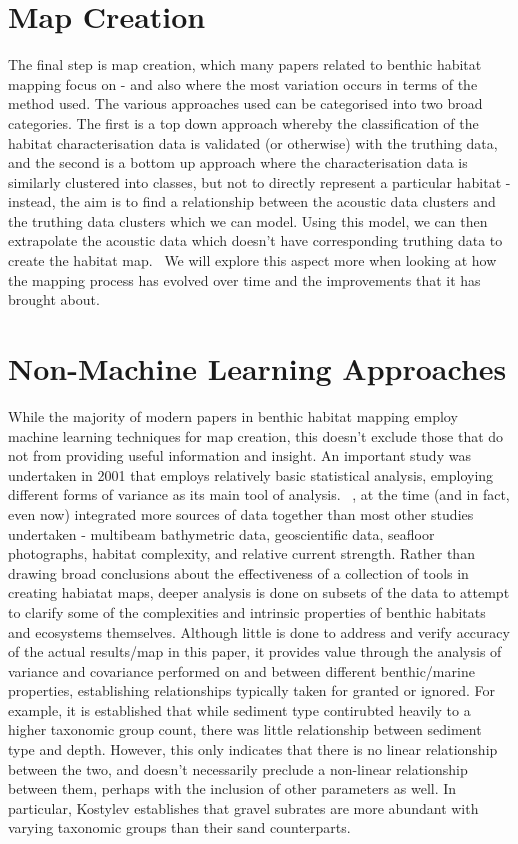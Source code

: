             \section{Map Creation}
            The final step is map creation, which many papers related to benthic habitat mapping focus on - and also where the most variation occurs in terms of the method used. The various approaches used can be categorised into two broad categories. The first is a top down approach whereby the classification of the habitat characterisation data is validated (or otherwise) with the truthing data, and the second is a bottom up approach where the characterisation data is similarly clustered into classes, but not to directly represent a particular habitat - instead, the aim is to find a relationship between the acoustic data clusters and the truthing data clusters which we can model. Using this model, we can then extrapolate the acoustic data which doesn't have corresponding truthing data to create the habitat map.~\citep{ahsan11} We will explore this aspect more when looking at how the mapping process has evolved over time and the improvements that it has brought about.

            \section{Non-Machine Learning Approaches} 
             While the majority of modern papers in benthic habitat mapping employ machine learning techniques for map creation, this doesn't exclude those that do not from providing useful information and insight. An important study was undertaken in 2001 that employs relatively basic statistical analysis, employing different forms of variance as its main tool of analysis. ~\citep{kostylev01}, at the time (and in fact, even now) integrated more sources of data together than most other studies undertaken - multibeam bathymetric data, geoscientific data, seafloor photographs, habitat complexity, and relative current strength. Rather than drawing broad conclusions about the effectiveness of a collection of tools in creating habiatat maps, deeper analysis is done on subsets of the data to attempt to clarify some of the complexities and intrinsic properties of benthic habitats and ecosystems themselves. Although little is done to address and verify accuracy of the actual results/map in this paper, it provides value through the analysis of variance and covariance performed on and between different benthic/marine properties, establishing relationships typically taken for granted or ignored. For example, it is established that while sediment type contirubted heavily to a higher taxonomic group count, there was little relationship between sediment type and depth. However, this only indicates that there is no linear relationship between the two, and doesn't necessarily preclude a non-linear relationship between them, perhaps with the inclusion of other parameters as well. In particular, Kostylev establishes that gravel subrates are more abundant with varying taxonomic groups than their sand counterparts.

